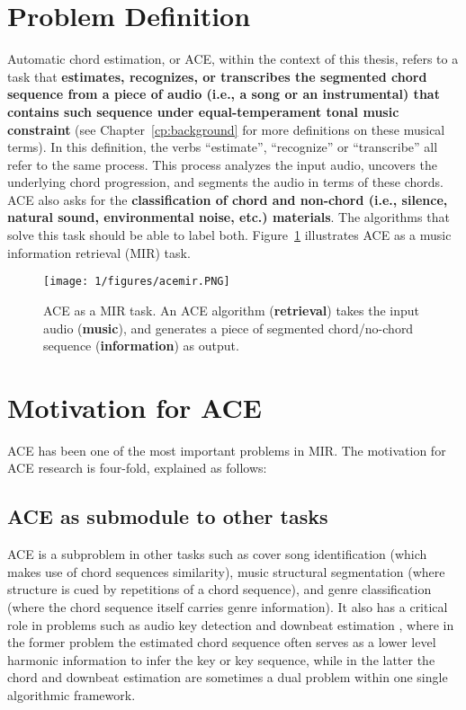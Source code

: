 \section{Problem Definition} \label{sec:1-problemdef}
Automatic chord estimation, or ACE, within the context of this thesis, refers to a task that \textbf{estimates, recognizes, or transcribes the segmented chord sequence from a piece of audio (i.e., a song or an instrumental) that contains such sequence under equal-temperament tonal music constraint} (see Chapter~\ref{cp:background} for more definitions on these musical terms). In this definition, the verbs ``estimate'', ``recognize'' or ``transcribe'' all refer to the same process. This process analyzes the input audio, uncovers the underlying chord progression, and segments the audio in terms of these chords. ACE also asks for the \textbf{classification of chord and non-chord (i.e., silence, natural sound, environmental noise, etc.) materials}. The algorithms that solve this task should be able to label both. Figure~\ref{fig:1-acemir} illustrates ACE as a music information retrieval (MIR) task.
\begin{figure}[h]
\centering
\texttt{[image: 1/figures/acemir.PNG]}
\caption{ACE as a MIR task. An ACE algorithm (\textbf{retrieval}) takes the input audio (\textbf{music}), and generates a piece of segmented chord/no-chord sequence (\textbf{information}) as output.}
\label{fig:1-acemir}
\end{figure}

\section{Motivation for ACE} \label{sec:1-moti}
ACE has been one of the most important problems in MIR. The motivation for ACE research is four-fold, explained as follows:

\subsection{ACE as submodule to other tasks}
ACE is a subproblem in other tasks such as cover song identification \cite{bello2007audio,lee2006identifying,serra2010audio} (which makes use of chord sequences similarity), music structural segmentation \cite{bello2005robust} (where structure is cued by repetitions of a chord sequence), and genre classification \cite{cheng2008automatic,perez2009genre} (where the chord sequence itself carries genre information). It also has a critical role in problems such as audio key detection \cite{papadopoulos2012modeling,pauwels2010integrating} and downbeat estimation \cite{papadopoulos2008simultaneous,mauch2010simultaneous}, where in the former problem the estimated chord sequence often serves as a lower level harmonic information to infer the key or key sequence, while in the latter the chord and downbeat estimation are sometimes a dual problem within one single algorithmic framework.

